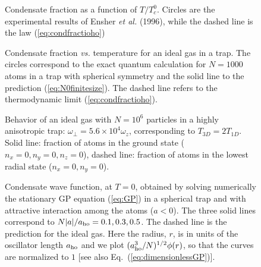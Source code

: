 \bigskip

\begin{figure}[t]
\epsfysize=8cm
\hspace{3cm}
\caption{Condensate fraction as a function of $T/T_c^0$. Circles are 
the experimental results of Ensher {\it et al.} (1996), while
the dashed line is the law (\protect\ref{eq:condfractioho})}  
\label{fig:condfrac-exp}
\end{figure}

\bigskip

\begin{figure}[t]
\epsfysize=8cm
\hspace{3cm}
\caption{Condensate fraction {\it vs.} temperature for an ideal gas in 
a trap. The circles correspond to the exact quantum calculation for $N=1000$ 
atoms in a trap with spherical symmetry and the solid line to the prediction  
(\protect\ref{eq:N0finitesize}). The dashed line refers to the thermodynamic 
limit  (\protect\ref{eq:condfractioho}). } 
\label{fig:s-condfrac}
\end{figure}

\bigskip

\begin{figure}[t]
\epsfysize=8cm
\hspace{3cm}
\caption{Behavior of an ideal gas with $N=10^6$ particles in a highly 
anisotropic trap: $\omega_\perp=5.6 \times 10^4 \omega_z$, corresponding 
to $T_{3D}=2T_{1D}$. Solid line: fraction of atoms in the ground state 
($n_x=0,n_y=0,n_z=0$), dashed line: fraction of atoms in the lowest radial 
state ($n_x=0,n_y=0$). } 
\label{fig:twostep}
\end{figure}

\bigskip

\begin{figure}[t]
\epsfysize=8cm
\hspace{3cm}
\caption{Condensate wave function, at $T=0$, obtained by solving 
numerically the stationary GP equation (\protect\ref{eq:GP}) 
in a spherical trap and with attractive interaction among the atoms
($a<0$). The  three solid lines correspond to $N|a|/a_{\rm ho}= 0.1, 0.3, 
0.5$. The dashed line is the prediction for the ideal gas. Here 
the radius, $r$, is in units of the oscillator length $a_{\rm ho}$ 
and we plot $(a_{\rm ho}^3/N)^{1/2} \phi(r)$, so that the curves are 
normalized to $1$ [see also 
Eq.~(\protect\ref{eq:dimensionlessGP})]. }
\label{fig:aneg}
\end{figure}

